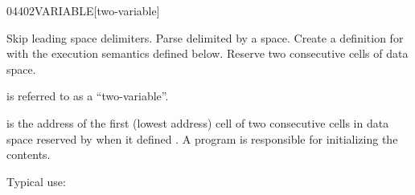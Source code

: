 \begin{worddef}{0440}{2VARIABLE}[two-variable]
\item {}

	Skip leading space delimiters. Parse  delimited by a
	space. Create a definition for  with the execution
	semantics defined below. Reserve two consecutive cells of data
	space.

	 is referred to as a ``two-variable''.

\execute[name]

	 is the address of the first (lowest address)
	cell of two consecutive cells in data space reserved by
	 when it defined . A program is
	responsible for initializing the contents.


	\begin{rationale} %
		Typical use:
			 
	\end{rationale}

	\begin{testing}
		 \\
		 \\
		 \\
		 \\

		 \\
		 \\
		 \\
		 \\

		 \\
	\end{testing}
\end{worddef}

